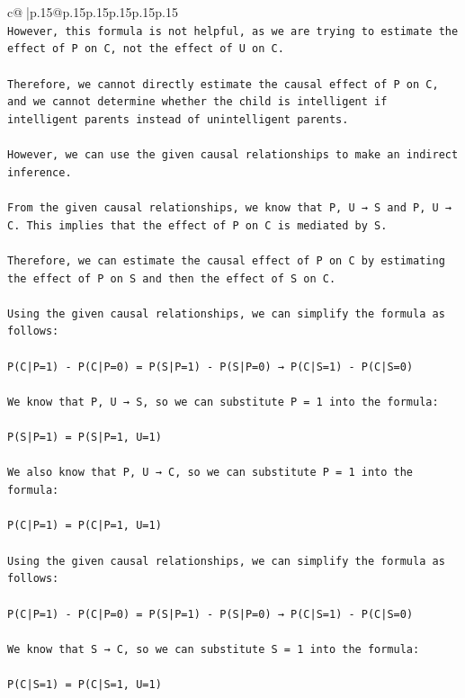 \documentclass{article}
\begin{document}
{\begin{supertabular}{c@{$\;$}|p{.15\linewidth}@{}p{.15\linewidth}p{.15\linewidth}p{.15\linewidth}p{.15\linewidth}p{.15\linewidth}}
{{{\\ 
\texttt{However, this formula is not helpful, as we are trying to estimate the effect of P on C, not the effect of U on C.} \\
\\ 
\texttt{Therefore, we cannot directly estimate the causal effect of P on C, and we cannot determine whether the child is intelligent if intelligent parents instead of unintelligent parents.} \\
\\ 
\texttt{However, we can use the given causal relationships to make an indirect inference.} \\
\\ 
\texttt{From the given causal relationships, we know that P, U → S and P, U → C. This implies that the effect of P on C is mediated by S.} \\
\\ 
\texttt{Therefore, we can estimate the causal effect of P on C by estimating the effect of P on S and then the effect of S on C.} \\
\\ 
\texttt{Using the given causal relationships, we can simplify the formula as follows:} \\
\\ 
\texttt{P(C|P=1) {-} P(C|P=0) = P(S|P=1) {-} P(S|P=0) → P(C|S=1) {-} P(C|S=0)} \\
\\ 
\texttt{We know that P, U → S, so we can substitute P = 1 into the formula:} \\
\\ 
\texttt{P(S|P=1) = P(S|P=1, U=1)} \\
\\ 
\texttt{We also know that P, U → C, so we can substitute P = 1 into the formula:} \\
\\ 
\texttt{P(C|P=1) = P(C|P=1, U=1)} \\
\\ 
\texttt{Using the given causal relationships, we can simplify the formula as follows:} \\
\\ 
\texttt{P(C|P=1) {-} P(C|P=0) = P(S|P=1) {-} P(S|P=0) → P(C|S=1) {-} P(C|S=0)} \\
\\ 
\texttt{We know that S → C, so we can substitute S = 1 into the formula:} \\
\\ 
\texttt{P(C|S=1) = P(C|S=1, U=1)} \\
}}}
\end{supertabular}}
\end{document}
